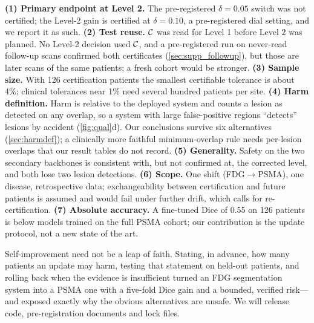 \textbf{(1) Primary endpoint at Level 2.} The pre-registered $\delta=0.05$ switch was not certified; the Level-2 gain is certified at $\delta=0.10$, a pre-registered dial setting, and we report it as such.
\textbf{(2) Test reuse.} $\mathcal{C}$ was read for Level 1 before Level 2 was planned. No Level-2 decision used $\mathcal{C}$, and a pre-registered run on never-read follow-up scans confirmed both certificates (\cref{sec:supp_followup}), but those are later scans of the same patients; a fresh cohort would be stronger.
\textbf{(3) Sample size.} With 126 certification patients the smallest certifiable tolerance is about 4\%; clinical tolerances near 1\% need several hundred patients per site.
\textbf{(4) Harm definition.} Harm is relative to the deployed system and counts a lesion as detected on any overlap, so a system with large false-positive regions ``detects'' lesions by accident (\cref{fig:qual}d). Our conclusions survive six alternatives (\cref{sec:harmdef}); a clinically more faithful minimum-overlap rule needs per-lesion overlaps that our result tables do not record.
\textbf{(5) Generality.} Safety on the two secondary backbones is consistent with, but not confirmed at, the corrected level, and both lose two lesion detections.
\textbf{(6) Scope.} One shift (FDG$\to$PSMA), one disease, retrospective data; exchangeability between certification and future patients is assumed and would fail under further drift, which calls for re-certification.
\textbf{(7) Absolute accuracy.} A fine-tuned Dice of 0.55 on 126 patients is below models trained on the full PSMA cohort; our contribution is the update protocol, not a new state of the art.

Self-improvement need not be a leap of faith.
Stating, in advance, how many patients an update may harm, testing that statement on held-out patients, and rolling back when the evidence is insufficient turned an FDG segmentation system into a PSMA one with a five-fold Dice gain and a bounded, verified risk---and exposed exactly why the obvious alternatives are unsafe.
We will release code, pre-registration documents and lock files.
